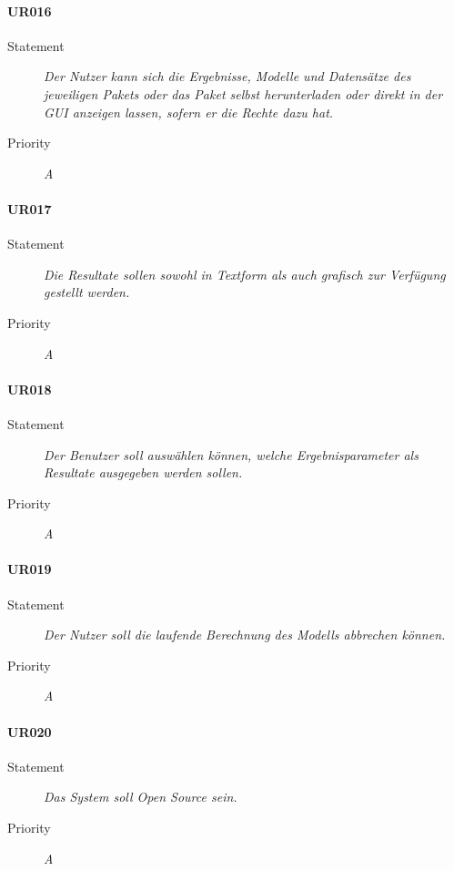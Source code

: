 \paragraph{UR016}
\begin{description}
\item[Statement] \textit{Der Nutzer kann sich die Ergebnisse, Modelle und Datensätze des jeweiligen \gls{Paket}s oder das \gls{Paket} selbst herunterladen oder direkt in der \gls{GUI} anzeigen lassen, sofern er die Rechte dazu hat.}
\item[Priority] \textit{A}
\end{description}


\paragraph{UR017}
\begin{description}
\item[Statement] \textit{Die Resultate sollen sowohl in Textform als auch grafisch zur Verfügung gestellt werden.}
\item[Priority] \textit{A}
\end{description}

\paragraph{UR018}
\begin{description}
  \item[Statement]
    \textit{Der Benutzer soll auswählen können, welche Ergebnisparameter als Resultate ausgegeben werden sollen.}
  \item[Priority]
    \textit{A}
\end{description}

\paragraph{UR019}
\begin{description}
\item[Statement] \textit{Der Nutzer soll die laufende Berechnung des Modells abbrechen können.}
\item[Priority] \textit{A}
\end{description}

\paragraph{UR020}
\begin{description}
\item[Statement] \textit{Das System soll \gls{Open Source} sein.}
\item[Priority] \textit{A}
\end{description}

